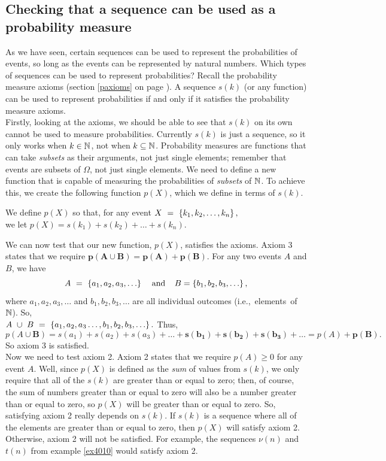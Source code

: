 \subsection{Checking that a sequence can be used as a probability measure}
As we have seen, certain sequences can be used to represent the probabilities of events, so long as the events can be represented by natural numbers. Which types of sequences can be used to represent probabilities? Recall the probability measure axioms (section \ref{paxioms} on page \pageref{paxioms}). A sequence $s(k)$ (or any function) can be used to represent probabilities if and only if it satisfies the probability measure axioms. \\

Firstly, looking at the axioms, we should be able to see that $s(k)$ on its own cannot be used to measure probabilities. Currently $s(k)$ is just a sequence, so it only works when $k \in \mathbb{N}$, not when $k \subseteq \mathbb{N}$. Probability measures are functions that can take \textit{subsets} as their arguments, not just single elements; remember that events are subsets of $\Omega$, not just single elements. We need to define a new function that is capable of measuring the probabilities of \textit{subsets} of $\mathbb{N}$. To achieve this, we create the following function $p(X)$, which we define in terms of $s(k)$.
\begin{center}
We define $p(X)$ so that, for any event $X~=~\left\{k_1,k_2,\ldots,k_n\right\},$ \\ we let $p(X) = s(k_1) + s(k_2) + \ldots + s(k_n)$.
\end{center}
\noindent We can now test that our new function, $p(X)$, satisfies the axioms. Axiom 3 states that we require $\boldsymbol{p(A \cup B) = p(A) + p(B)}$. For any two events $A$ and $B$, we have
\[
A~=~\left\{a_1,a_2,a_3,\ldots\right\} \;\;\;\; \text{and} \;\;\;\; B = \left\{b_1,b_2,b_3,\ldots\right\},
\]
where $a_1,a_2,a_3,\ldots$ and $b_1,b_2,b_3,\ldots$ are all individual outcomes (i.e.,~elements~of~$\mathbb{N}$). So, \\
$A~\cup~B~=~\left\{a_1,a_2,a_3\ldots,b_1,b_2,b_3,\ldots\right\}.$ Thus,
\[
p(A \cup \mathbf{B}) = s(a_1) + s(a_2) + s(a_3) + \ldots + \boldsymbol{s(b_1) + s(b_2) + s(b_3) + \ldots}  = p(A) + \mathbf{p(B)}.
\]
So axiom 3 is satisfied. \\

\noindent Now we need to test axiom 2. Axiom 2 states that we require $p(A) \geq 0$ for any event $A$. Well, since $p(X)$ is defined as the \textit{sum} of values from $s(k)$, we only require that all of the $s(k)$ are greater than or equal to zero; then, of course, the sum of numbers greater than or equal to zero will also be a number greater than or equal to zero, so $p(X)$ will be greater than or equal to zero. So, satisfying axiom 2 really depends on $s(k)$. If $s(k)$ is a sequence where all of the elements are greater than or equal to zero, then $p(X)$ will satisfy axiom 2. Otherwise, axiom 2 will not be satisfied. For example, the sequences $\nu(n)$ and $t(n)$ from example \ref{ex4010} would satisfy axiom 2. \\

